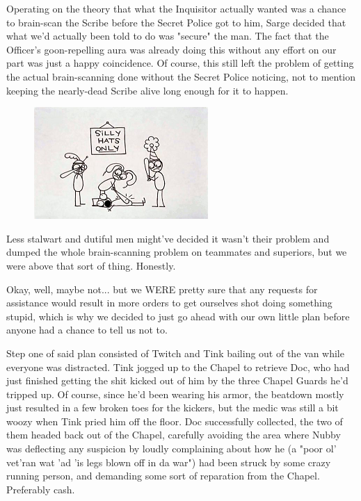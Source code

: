 Operating on the theory that what the Inquisitor actually wanted was a chance to brain-scan the Scribe before the Secret Police got to him, Sarge decided that what we'd actually been told to do was "secure" the man. 
The fact that the Officer's goon-repelling aura was already doing this without any effort on our part was just a happy coincidence. 
Of course, this still left the problem of getting the actual brain-scanning done without the Secret Police noticing, not to mention keeping the nearly-dead Scribe alive long enough for it to happen.

\begin{figure}
	\begin{center}
		\includegraphics[width=\figwidth]{pics/17/49.png}
	\end{center}
\end{figure}
Less stalwart and dutiful men might've decided it wasn't their problem and dumped the whole brain-scanning problem on teammates and superiors, but we were above that sort of thing. 
Honestly.

Okay, well, maybe not... 
but we WERE pretty sure that any requests for assistance would result in more orders to get ourselves shot doing something stupid, which is why we decided to just go ahead with our own little plan before anyone had a chance to tell us not to. 


Step one of said plan consisted of Twitch and Tink bailing out of the van while everyone was distracted. 
Tink jogged up to the Chapel to retrieve Doc, who had just finished getting the shit kicked out of him by the three Chapel Guards he'd tripped up. 
Of course, since he'd been wearing his armor, the beatdown mostly just resulted in a few broken toes for the kickers, but the medic was still a bit woozy when Tink pried him off the floor. 
Doc successfully collected, the two of them headed back out of the Chapel, carefully avoiding the area where Nubby was deflecting any suspicion by loudly complaining about how he (a "poor ol' vet'ran wat 'ad 'is legs blown off in da war") had been struck by some crazy running person, and demanding some sort of reparation from the Chapel. 
Preferably cash.

